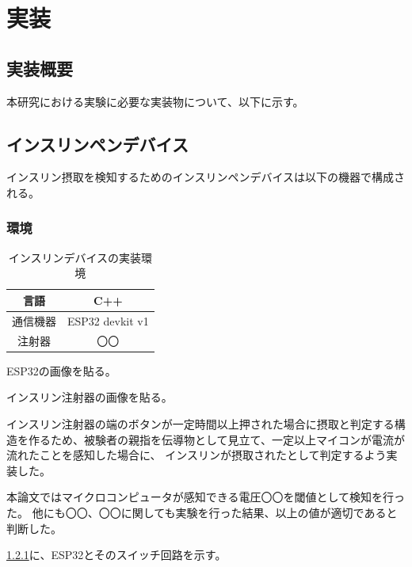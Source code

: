 \chapter{実装}
\label{chap:implementation}

\section{実装概要}
本研究における実験に必要な実装物について、以下に示す。

\section{インスリンペンデバイス}
\label{section:insulin_pen_device}

インスリン摂取を検知するためのインスリンペンデバイスは以下の機器で構成される。

\subsection{環境}

\begin{table}[htbp]
  \caption{インスリンデバイスの実装環境}
  \label{tb:insulin-device}
  \begin{center}
    \begin{tabular}{c||c}
      \hline
      言語  & C++ \\\hline
      通信機器  & ESP32 devkit v1 \\\hline
      注射器 & 〇〇 \\\hline
    \end{tabular}
  \end{center}
\end{table}

ESP32の画像を貼る。

インスリン注射器の画像を貼る。

インスリン注射器の端のボタンが一定時間以上押された場合に摂取と判定する構造を作るため、被験者の親指を伝導物として見立て、一定以上マイコンが電流が流れたことを感知した場合に、
インスリンが摂取されたとして判定するよう実装した。

本論文ではマイクロコンピュータが感知できる電圧〇〇を閾値として検知を行った。
他にも〇〇、〇〇に関しても実験を行った結果、以上の値が適切であると判断した。

\ref{}に、ESP32とそのスイッチ回路を示す。

